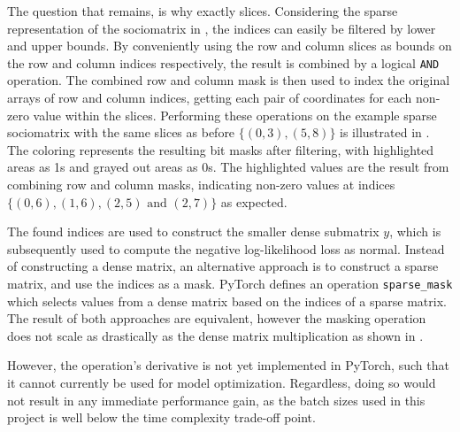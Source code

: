         The question that remains, is why exactly slices. Considering the sparse representation of the sociomatrix in , the indices can easily be filtered by lower and upper bounds. By conveniently using the row and column slices as bounds on the row and column indices respectively, the result is combined by a logical \texttt{AND} operation. The combined row and column mask is then used to index the original arrays of row and column indices, getting each pair of coordinates for each non-zero value within the slices. Performing these operations on the example sparse sociomatrix with the same slices as before $\{(0,3), (5,8)\}$ is illustrated in . The coloring represents the resulting bit masks after filtering, with highlighted areas as 1s and grayed out areas as 0s. The highlighted values are the result from combining row and column masks, indicating non-zero values at indices $\{(0,6),(1,6),(2,5) \text{ and } (2,7)\}$ as expected.
        
        The found indices are used to construct the smaller dense submatrix $y$, which is subsequently used to compute the negative log-likelihood loss as normal.
        Instead of constructing a dense matrix, an alternative approach is to construct a sparse matrix, and use the indices as a mask. PyTorch defines an operation \texttt{sparse\_mask} which selects values from a dense matrix based on the indices of a sparse matrix. The result of both approaches are equivalent, however the masking operation does not scale as drastically as the dense matrix multiplication as shown in .
        
        However, the operation's derivative is not yet implemented in PyTorch, such that it cannot currently be used for model optimization. Regardless, doing so would not result in any immediate performance gain, as the batch sizes used in this project is well below the time complexity trade-off point.
        
        
